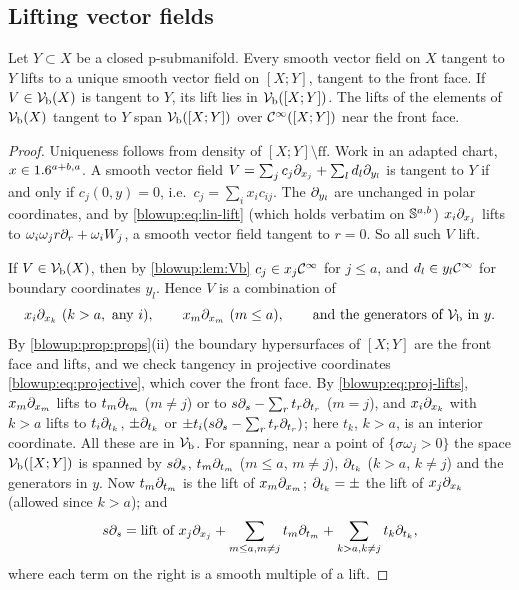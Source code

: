 \subsection{Lifting vector fields}
\begin{proposition}\label{blowup:prop:vf}
Let $Y\subset X$ be a closed p-submanifold. Every smooth vector field on $X$ tangent to
$Y$ lifts to a unique smooth vector field on $[X;Y]$, tangent to the front face. If
$V\in\mathcal{V}_{\mathrm{b}}(X)$ is tangent to $Y$, its lift lies in $\mathcal{V}_{\mathrm{b}}([X;Y])$. The lifts of the elements
of $\mathcal{V}_{\mathrm{b}}(X)$ tangent to $Y$ span $\mathcal{V}_{\mathrm{b}}([X;Y])$ over $\mathcal{C}^\infty([X;Y])$ near the front face.
\end{proposition}
\begin{proof}
Uniqueness follows from density of $[X;Y]\setminus\mathrm{ff}$. Work in an adapted chart,
$x\in1.6^{a+b,a}$. A smooth vector field $V=\sum_jc_j\partial_{x_j}+\sum_ld_l\partial_{y_l}$ is tangent
to $Y$ if and only if $c_j(0,y)=0$, i.e.\ $c_j=\sum_ix_ic_{ij}$. The $\partial_{y_l}$ are
unchanged in polar coordinates, and by \eqref{blowup:eq:lin-lift} (which holds verbatim
on $\mathbb{S}^{a,b}$) $x_i\partial_{x_j}$ lifts to $\omega_i\omega_jr\partial_r+\omega_iW_j$, a smooth
vector field tangent to $r=0$. So all such $V$ lift.

If $V\in\mathcal{V}_{\mathrm{b}}(X)$, then by \cref{blowup:lem:Vb} $c_j\in x_j\mathcal{C}^\infty$ for $j\le a$, and $d_l\in
y_l\mathcal{C}^\infty$ for boundary coordinates $y_l$. Hence $V$ is a combination of
\begin{equation}\label{blowup:eq:Vb-Y}
  x_i\partial_{x_k}\ (k>a,\ \text{any } i),\qquad x_m\partial_{x_m}\ (m\le a),\qquad
  \text{and the generators of }\mathcal{V}_{\mathrm{b}}\text{ in }y.
\end{equation}
By \cref{blowup:prop:props}(ii) the boundary hypersurfaces of $[X;Y]$ are the front face
and lifts, and we check tangency in projective coordinates
\eqref{blowup:eq:projective}, which cover the front face. By
\eqref{blowup:eq:proj-lifts}, $x_m\partial_{x_m}$ lifts to $t_m\partial_{t_m}$ ($m\ne j$) or to
$s\partial_s-\sum_rt_r\partial_{t_r}$ ($m=j$), and $x_i\partial_{x_k}$ with $k>a$ lifts to $t_i\partial_{t_k}$,
$\pm\partial_{t_k}$ or $\pm t_i(s\partial_s-\sum_rt_r\partial_{t_r})$; here $t_k$, $k>a$, is an interior
coordinate. All these are in $\mathcal{V}_{\mathrm{b}}$. For spanning, near a point of $\{\sigma\omega_j>0\}$ the
space $\mathcal{V}_{\mathrm{b}}([X;Y])$ is spanned by $s\partial_s$, $t_m\partial_{t_m}$ ($m\le a$, $m\ne j$), $\partial_{t_k}$
($k>a$, $k\ne j$) and the generators in $y$. Now $t_m\partial_{t_m}$ is the lift of
$x_m\partial_{x_m}$; $\partial_{t_k}=\pm$ the lift of $x_j\partial_{x_k}$ (allowed since $k>a$); and
\begin{equation*}
  s\partial_s=\text{lift of }x_j\partial_{x_j}+\sum_{m\le a,m\ne j}t_m\partial_{t_m}+
  \sum_{k>a,k\ne j}t_k\partial_{t_k},
\end{equation*}
where each term on the right is a smooth multiple of a lift.
\end{proof}

